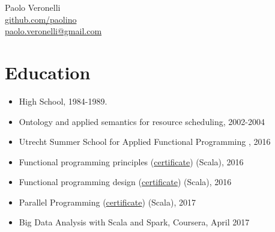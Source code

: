 \documentclass[letterpaper,10pt,oneside]{article}
\begin{document}
    \begin{center}
        \Huge{Paolo Veronelli} \\
        \vspace{1em}
        \normalsize{\href{https://github.com/paolino}{github.com/paolino}} \\ 
        \normalsize{\href{mailto:paolo.veronelli@gmail.com}{paolo.veronelli@gmail.com}}
    \end{center}

    \renewcommand{\labelitemi}{$\diamond$}
    \section*{Education}
        \begin{itemize}
            \item High School, 1984-1989.
            \item Ontology and applied semantics for resource scheduling, 2002-2004 
            \item Utrecht Summer School for Applied Functional Programming , 2016
            \item Functional programming principles (\href{https://www.coursera.org/account/accomplishments/certificate/8NVXL4Y3XUB6}{certificate}) (Scala), 2016
            \item Functional programming design (\href{https://www.coursera.org/account/accomplishments/certificate/WTU8B8G54N79}{certificate}) (Scala), 2016
            \item Parallel Programming (\href{https://www.coursera.org/account/accomplishments/certificate/YU7BSRL8VFTT}{certificate}) (Scala), 2017
            \item 
            Big Data Analysis with Scala and Spark, Coursera, April 2017
        \end{itemize}
\end{document}
